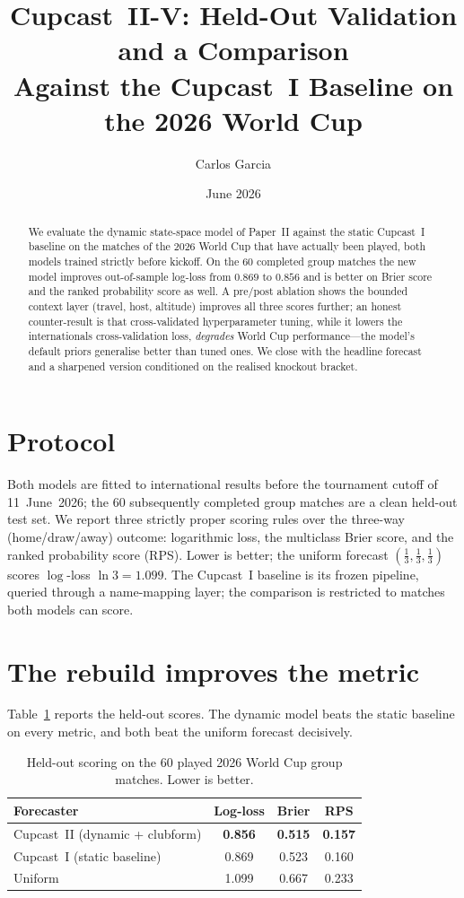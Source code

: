 \documentclass[11pt]{article}
\title{Cupcast~II-V: Held-Out Validation and a Comparison\\
Against the Cupcast~I Baseline on the 2026 World Cup}
\author{Carlos Garcia}
\date{June 2026}
\begin{document}
\maketitle

\begin{abstract}
We evaluate the dynamic state-space model of Paper~II against the static
Cupcast~I baseline on the matches of the 2026 World Cup that have actually been
played, both models trained strictly before kickoff. On the $60$ completed group
matches the new model improves out-of-sample log-loss from $0.869$ to $0.856$
and is better on Brier score and the ranked probability score as well. A
pre/post ablation shows the bounded context layer (travel, host, altitude)
improves all three scores further; an honest counter-result is that
cross-validated hyperparameter tuning, while it lowers the internationals
cross-validation loss, \emph{degrades} World Cup performance---the model's
default priors generalise better than tuned ones. We close with the headline
forecast and a sharpened version conditioned on the realised knockout bracket.
\end{abstract}

\section{Protocol}
Both models are fitted to international results before the tournament cutoff of
11~June~2026; the $60$ subsequently completed group matches are a clean held-out
test set. We report three strictly proper scoring rules \cite{gneitingraftery2007}
over the three-way (home/draw/away) outcome: logarithmic loss, the multiclass
Brier score, and the ranked probability score (RPS). Lower is better; the uniform
forecast $(\tfrac13,\tfrac13,\tfrac13)$ scores $\log$-loss $\ln 3 = 1.099$.
The Cupcast~I baseline is its frozen pipeline, queried through a name-mapping
layer; the comparison is restricted to matches both models can score.

\section{The rebuild improves the metric}
Table~\ref{tab:headline} reports the held-out scores. The dynamic model beats the
static baseline on every metric, and both beat the uniform forecast decisively.

\begin{table}[h]\centering
\begin{tabular}{lccc}
\toprule
Forecaster & Log-loss & Brier & RPS \\
\midrule
Cupcast~II (dynamic + clubform) & \textbf{0.856} & \textbf{0.515} & \textbf{0.157} \\
Cupcast~I (static baseline)     & 0.869 & 0.523 & 0.160 \\
Uniform                         & 1.099 & 0.667 & 0.233 \\
\bottomrule
\end{tabular}
\caption{Held-out scoring on the 60 played 2026 World Cup group matches. Lower
is better.}\label{tab:headline}
\end{table}
\end{document}
